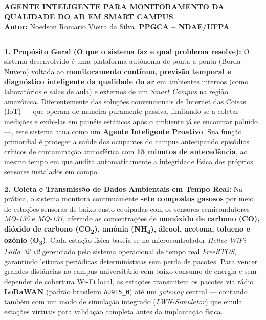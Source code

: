 \documentclass[11pt, a4paper]{article}
\begin{document}
\pagestyle{empty}

\begin{center}
    {\large\bfseries AGENTE INTELIGENTE PARA MONITORAMENTO DA QUALIDADE DO AR EM SMART CAMPUS}\\[0.12cm]
    {\small\textbf{Autor:} Noedson Romario Vieira da Silva \quad|\quad \textbf{PPGCA -- NDAE/UFPA}}
    \vspace{0.06cm}
    \hrule
\end{center}

\vspace{0.06cm}

\noindent\textbf{1. Propósito Geral (O que o sistema faz e qual problema resolve):}
O sistema desenvolvido é uma plataforma autônoma de ponta a ponta (Borda-Nuvem) voltada ao \textbf{monitoramento contínuo, previsão temporal e diagnóstico inteligente da qualidade do ar} em ambientes internos (como laboratórios e salas de aula) e externos de um \emph{Smart Campus} na região amazônica. Diferentemente das soluções convencionais de Internet das Coisas (IoT) --- que operam de maneira puramente passiva, limitando-se a coletar medições e exibi-las em painéis estáticos após o ambiente já se encontrar poluído ---, este sistema atua como um \textbf{Agente Inteligente Proativo}. Sua função primordial é proteger a saúde dos ocupantes do campus antecipando episódios críticos de contaminação atmosférica com \textbf{15 minutos de antecedência}, ao mesmo tempo em que audita automaticamente a integridade física dos próprios sensores instalados em campo.

\noindent\textbf{2. Coleta e Transmissão de Dados Ambientais em Tempo Real:}
Na prática, o sistema monitora continuamente \textbf{sete compostos gasosos} por meio de estações sensoras de baixo custo equipadas com os sensores semicondutores \emph{MQ-135} e \emph{MQ-131}, aferindo as concentrações de \textbf{monóxido de carbono (CO), dióxido de carbono (CO\textsubscript{2}), amônia (NH\textsubscript{4}), álcool, acetona, tolueno e ozônio (O\textsubscript{3})}. Cada estação física baseia-se no microcontrolador \emph{Heltec WiFi LoRa 32 v2} gerenciado pelo sistema operacional de tempo real \emph{FreeRTOS}, garantindo leituras periódicas determinísticas sem perda de pacotes. Para vencer grandes distâncias no campus universitário com baixo consumo de energia e sem depender de cobertura Wi-Fi local, as estações transmitem os pacotes via rádio \textbf{LoRaWAN} (padrão brasileiro \texttt{AU915\_0}) até um \emph{gateway} central --- contando também com um modo de simulação integrado (\emph{LWN-Simulator}) que emula estações virtuais para validação completa antes da implantação física.
\end{document}
